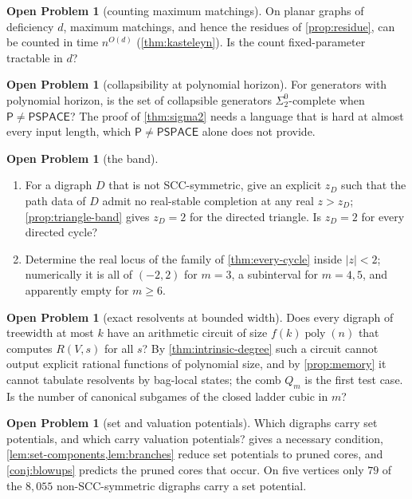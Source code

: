 \documentclass[11pt]{amsart}
\theoremstyle{plain}
\theoremstyle{definition}
\newtheorem{problem}[theorem]{Open Problem}
\theoremstyle{remark}
\numberwithin{equation}{section}
\newcommand{\poly}{\operatorname{poly}}
\newcommand{\cls}[1]{\mathsf{#1}}
\newcommand{\PSPACE}{\cls{PSPACE}}
\newcommand{\Pclass}{\cls{P}}
\begin{document}
\begin{problem}[counting maximum matchings]\label{prob:fpt-deficiency}
On planar graphs of deficiency $d$, maximum matchings, and hence the residues of \cref{prop:residue}, can be counted in time $n^{O(d)}$ (\cref{thm:kasteleyn}). Is the count fixed-parameter tractable in $d$?
\end{problem}

\begin{problem}[collapsibility at polynomial horizon]\label{prob:sigma2}
For generators with polynomial horizon, is the set of collapsible generators $\Sigma^0_2$-complete when $\Pclass\neq\PSPACE$? The proof of \cref{thm:sigma2} needs a language that is hard at almost every input length, which $\Pclass\neq\PSPACE$ alone does not provide.
\end{problem}

\begin{problem}[the band]\label{prob:band}
\begin{enumerate}[label=\textup{(\alph*)}]
\item For a digraph $D$ that is not SCC-symmetric, give an explicit $z_D$ such that the path data of $D$ admit no real-stable completion at any real $z>z_D$; \cref{prop:triangle-band} gives $z_D=2$ for the directed triangle. Is $z_D=2$ for every directed cycle?
\item Determine the real locus of the family of \cref{thm:every-cycle} inside $|z|<2$; numerically it is all of $(-2,2)$ for $m=3$, a subinterval for $m=4,5$, and apparently empty for $m\ge6$.
\end{enumerate}
\end{problem}

\begin{problem}[exact resolvents at bounded width]\label{prob:tw-circuits}
Does every digraph of treewidth at most $k$ have an arithmetic circuit of size $f(k)\poly(n)$ that computes $R(V,s)$ for all $s$? By \cref{thm:intrinsic-degree} such a circuit cannot output explicit rational functions of polynomial size, and by \cref{prop:memory} it cannot tabulate resolvents by bag-local states; the comb $Q_m$ is the first test case. Is the number of canonical subgames of the closed ladder cubic in $m$?
\end{problem}

\begin{problem}[set and valuation potentials]\label{prob:setpot}
Which digraphs carry set potentials, and which carry valuation potentials?  gives a necessary condition, \cref{lem:set-components,lem:branches} reduce set potentials to pruned cores, and \cref{conj:blowups} predicts the pruned cores that occur. On five vertices only $79$ of the $8{,}055$ non-SCC-symmetric digraphs carry a set potential.
\end{problem}
\end{document}
